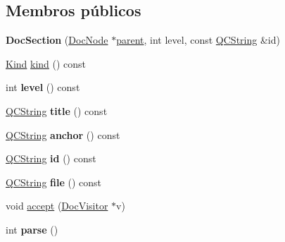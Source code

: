 \subsection*{Membros públicos}
\begin{DoxyCompactItemize}
\item 
\hypertarget{class_doc_section_aa46ba44934373a7978ec11f59ce541b8}{{\bfseries Doc\-Section} (\hyperlink{class_doc_node}{Doc\-Node} $\ast$\hyperlink{class_doc_node_abd7f070d6b0a38b4da71c2806578d19d}{parent}, int level, const \hyperlink{class_q_c_string}{Q\-C\-String} \&id)}\label{class_doc_section_aa46ba44934373a7978ec11f59ce541b8}

\item 
\hyperlink{class_doc_node_aa10c9e8951b8ccf714a59ec321bdac5b}{Kind} \hyperlink{class_doc_section_aa9d037bed9f9a083d0cd01485637d843}{kind} () const 
\item 
\hypertarget{class_doc_section_a82c2056cb8c65be6ecfc66a160eb3c0f}{int {\bfseries level} () const }\label{class_doc_section_a82c2056cb8c65be6ecfc66a160eb3c0f}

\item 
\hypertarget{class_doc_section_adf5241b59706e696c508de8baa4c2f97}{\hyperlink{class_q_c_string}{Q\-C\-String} {\bfseries title} () const }\label{class_doc_section_adf5241b59706e696c508de8baa4c2f97}

\item 
\hypertarget{class_doc_section_acd17ae1d9600f864b1beb85dfb99a4f4}{\hyperlink{class_q_c_string}{Q\-C\-String} {\bfseries anchor} () const }\label{class_doc_section_acd17ae1d9600f864b1beb85dfb99a4f4}

\item 
\hypertarget{class_doc_section_a16d494b2a3ca96cb4fcb0560a52b52f2}{\hyperlink{class_q_c_string}{Q\-C\-String} {\bfseries id} () const }\label{class_doc_section_a16d494b2a3ca96cb4fcb0560a52b52f2}

\item 
\hypertarget{class_doc_section_aeaa8cdb0fbabc1058b7d3813f2fd223b}{\hyperlink{class_q_c_string}{Q\-C\-String} {\bfseries file} () const }\label{class_doc_section_aeaa8cdb0fbabc1058b7d3813f2fd223b}

\item 
void \hyperlink{class_doc_section_a7ba716e854ae2f8f87a4eb2140e302b6}{accept} (\hyperlink{class_doc_visitor}{Doc\-Visitor} $\ast$v)
\item 
\hypertarget{class_doc_section_a67007fc2be130666fbf3b065022756f4}{int {\bfseries parse} ()}\label{class_doc_section_a67007fc2be130666fbf3b065022756f4}

\end{DoxyCompactItemize}
